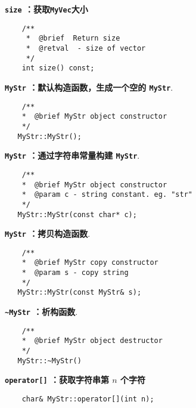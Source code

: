 \documentclass[a4paper]{ctexart}
\begin{document}
\vspace{2em}

\noindent \textbf{\texttt{size} ：获取\texttt{MyVec}大小}

\begin{lstlisting}
    /**
     *  @brief  Return size
     *  @retval  - size of vector
     */
    int size() const;
\end{lstlisting}

\vspace{3em}


\noindent \textbf{\texttt{MyStr} ：默认构造函数，生成一个空的 \texttt{MyStr}}.

\begin{lstlisting}
    /**
    *  @brief MyStr object constructor
    */
   MyStr::MyStr();
\end{lstlisting}

\vspace{3em}

\noindent \textbf{\texttt{MyStr} ：通过字符串常量构建 \texttt{MyStr}}.

\begin{lstlisting}
    /**
    *  @brief MyStr object constructor
    *  @param c - string constant. eg. "str"
    */
   MyStr::MyStr(const char* c);
\end{lstlisting}

\vspace{3em}


\noindent \textbf{\texttt{MyStr} ：拷贝构造函数}.

\begin{lstlisting}
    /**
    *  @brief MyStr copy constructor
    *  @param s - copy string
    */
   MyStr::MyStr(const MyStr& s);
\end{lstlisting}

\vspace{3em}

\noindent \textbf{\texttt{\textasciitilde MyStr} ：析构函数}.

\begin{lstlisting}
    /**
    *  @brief MyStr object destructor
    */
   MyStr::~MyStr()
\end{lstlisting}

\vspace{3em}

\noindent \textbf{\texttt{operator[]} ：获取字符串第 $n$ 个字符}

\begin{lstlisting}
    char& MyStr::operator[](int n);
\end{lstlisting}
\end{document}
